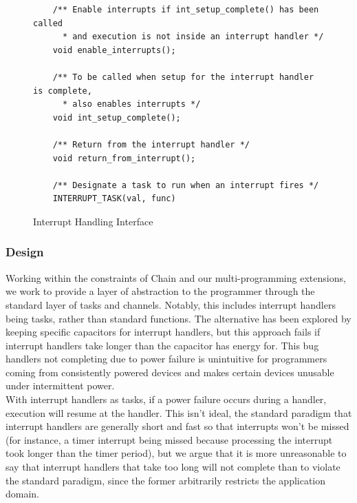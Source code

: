 \documentclass[11pt]{sensys-proc}
\newcommand{\chain}{Chain\xspace}
\begin{document}
\begin{figure}
\begin{minipage}[b]{0.49\textwidth}
\begin{lstlisting}
    /** Enable interrupts if int_setup_complete() has been called
      * and execution is not inside an interrupt handler */
    void enable_interrupts();

    /** To be called when setup for the interrupt handler is complete,
      * also enables interrupts */
    void int_setup_complete();

    /** Return from the interrupt handler */
    void return_from_interrupt();

    /** Designate a task to run when an interrupt fires */
    INTERRUPT_TASK(val, func)
\end{lstlisting}
\caption{Interrupt Handling Interface}\label{label-a}
\end{minipage}\hfill
\end{figure}

\subsubsection{Design}
Working within the constraints of \chain and our multi-programming extensions,
we work to provide a layer of abstraction to the programmer through the standard
layer of tasks and channels. Notably, this includes interrupt handlers being
tasks, rather than standard functions. The alternative has been explored
by keeping specific capacitors for interrupt handlers\cite{Aware}, but this
approach fails if interrupt handlers take longer than the capacitor has
energy for. This bug handlers not completing due to power failure is
unintuitive for programmers coming from consistently powered devices and
makes certain devices unusable under intermittent power.\\

With interrupt handlers as tasks, if a power failure occurs during a
handler, execution will resume at the handler. This isn't ideal, the
standard paradigm that interrupt handlers are generally short and fast
so that interrupts won't be missed (for instance, a timer interrupt
being missed because processing the interrupt took longer than the
timer period), but we argue that it is more unreasonable to say
that interrupt handlers that take too long will not complete than
to violate the standard paradigm, since the former arbitrarily restricts
the application domain.\\
\end{document}
